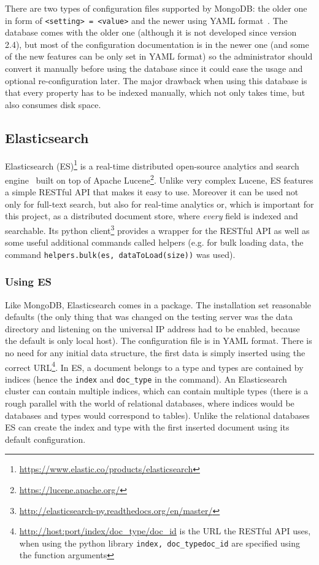 There are two types
of configuration files supported by MongoDB: the older one in form of \texttt{<setting> = <value>} and the 
newer using YAML format~\cite{YAML}. The database comes with the older one (although it is not developed since version 
2.4), but most of the configuration documentation is in the newer one (and some of the new features can be only set in 
YAML format) so the administrator should convert it manually before using the database since it could ease
the usage and optional re-configuration later.
The major drawback when using this database is that every property has to be indexed manually, which not only 
takes time, but also consumes disk space.


\subsection{Elasticsearch}

Elasticsearch (ES)\footnote{\url{https://www.elastic.co/products/elasticsearch}} is a real-time distributed open-source 
analytics and search engine~\cite{ESBook} 
built on top of Apache Lucene\footnote{\url{https://lucene.apache.org/}}. Unlike very complex Lucene, 
ES features a simple RESTful API that makes it easy to use. Moreover it can be used not only 
for full-text search, but also for real-time analytics or, which is important for this project, as a 
distributed document store, where \textit{every} field is indexed and searchable. Its python 
client\footnote{\url{http://elasticsearch-py.readthedocs.org/en/master/}} provides a wrapper for the RESTful API
as well as some useful additional commands called helpers (e.g. for bulk loading data, the command 
\texttt{helpers.bulk(es, dataToLoad(size))} was used).

\subsubsection{Using ES}

Like MongoDB, Elasticsearch comes in a package. The installation set reasonable 
defaults (the only thing that was changed on the testing server was the data directory and listening on the 
universal IP address had to be enabled, because the default is only local host). The 
configuration file is in YAML format. There is no need for any initial data structure,
the first data is simply inserted using the correct URL\footnote{\url{http://host:port/index/doc_type/doc_id}
is the URL the RESTful API uses, when using the python library \texttt{index, doc\_type}\texttt{doc\_id} are 
specified using the function arguments}. In ES, a document belongs to a type and types are contained by indices 
(hence the \texttt{index} and \texttt{doc\_type} in the command). 
An Elasticsearch cluster can contain multiple indices, which can contain 
multiple types (there is a rough parallel with the world of relational databases, where indices would be databases 
and types would correspond to tables). Unlike the relational databases ES can create the index and type with the 
first inserted document using its default configuration.

